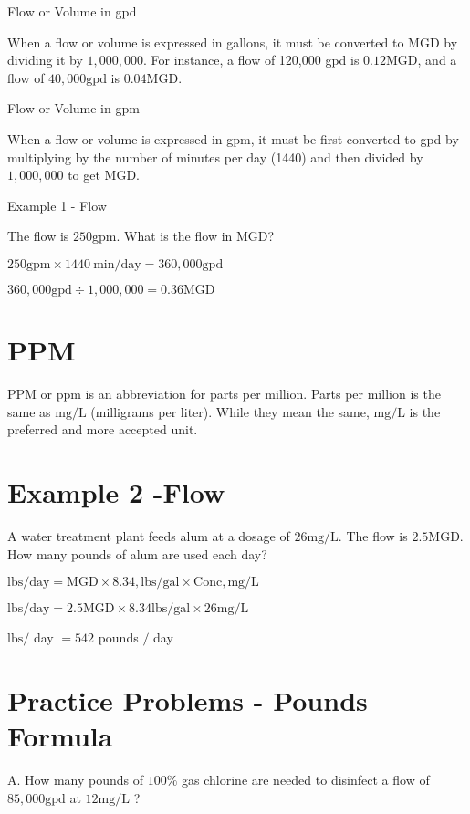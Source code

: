 Flow or Volume in gpd

When a flow or volume is expressed in gallons, it must be converted to MGD by dividing it by $1,000,000$. For instance, a flow of 120,000 gpd is $0.12 \mathrm{MGD}$, and a flow of $40,000 \mathrm{gpd}$ is $0.04 \mathrm{MGD}$.

Flow or Volume in gpm

When a flow or volume is expressed in gpm, it must be first converted to gpd by multiplying by the number of minutes per day (1440) and then divided by $1,000,000$ to get MGD.

Example 1 - Flow

The flow is $250 \mathrm{gpm}$. What is the flow in MGD?

$250 \mathrm{gpm} \times 1440 \mathrm{~min} / \mathrm{day}=360,000 \mathrm{gpd}$

$360,000 \mathrm{gpd} \div 1,000,000=0.36 \mathrm{MGD}$

\section{PPM}
PPM or ppm is an abbreviation for parts per million. Parts per million is the same as $\mathrm{mg} / \mathrm{L}$ (milligrams per liter). While they mean the same, $\mathrm{mg} / \mathrm{L}$ is the preferred and more accepted unit.

\section{Example 2 -Flow}
A water treatment plant feeds alum at a dosage of $26 \mathrm{mg} / \mathrm{L}$. The flow is $2.5 \mathrm{MGD}$. How many pounds of alum are used each day?

$\mathrm{lbs} / \mathrm{day}=\mathrm{MGD} \times 8.34, \mathrm{lbs} / \mathrm{gal} \times \mathrm{Conc}, \mathrm{mg} / \mathrm{L}$

$\mathrm{lbs} / \mathrm{day}=2.5 \mathrm{MGD} \times 8.34 \mathrm{lbs} / \mathrm{gal} \times 26 \mathrm{mg} / \mathrm{L}$

$\mathrm{lbs} /$ day $=542$ pounds $/$ day

\section{Practice Problems - Pounds Formula}
A. How many pounds of $100 \%$ gas chlorine are needed to disinfect a flow of $85,000 \mathrm{gpd}$ at $12 \mathrm{mg} / \mathrm{L}$ ?

